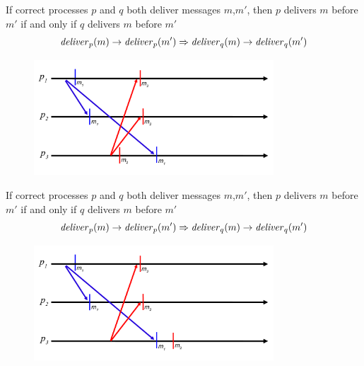 \begin{frame}

\begin{definition}
If correct processes $p$ and $q$ both deliver messages $m$,$m'$, then $p$ delivers $m$ before $m'$ if and only if $q$ delivers $m$ before $m'$
\[
  \mathit{deliver}_p(m) \rightarrow \mathit{deliver}_p(m') \Rightarrow \mathit{deliver}_q(m) \rightarrow \mathit{deliver}_q(m')
\]
\end{definition}

 

\begin{figure}
\includegraphics[width=0.8\textwidth]{figs/04/rb-causal1}
\end{figure}

\end{frame}

\begin{frame}

\begin{definition}
If correct processes $p$ and $q$ both deliver messages $m$,$m'$, then $p$ delivers $m$ before $m'$ if and only if $q$ delivers $m$ before $m'$
\[
  \mathit{deliver}_p(m) \rightarrow \mathit{deliver}_p(m') \Rightarrow \mathit{deliver}_q(m) \rightarrow \mathit{deliver}_q(m')
\]
\end{definition}

 

\begin{figure}
\includegraphics[width=0.8\textwidth]{figs/04/rb-total}
\end{figure}

\end{frame}

